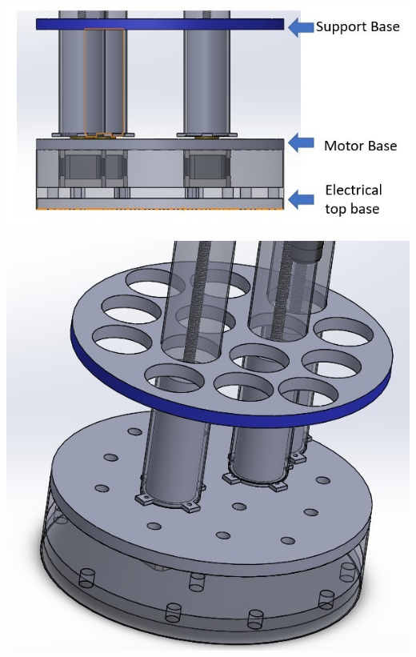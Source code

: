 \documentclass[11pt,landscape]{article}
\newenvironment{Figure}
  {\par\medskip\noindent\minipage{\linewidth}}
  {\endminipage\par\medskip}
\begin{document}
\begin{multicols}{3}
    \begin{Figure}
        \begin{center}
            \includegraphics[width=\textwidth]{Figure6.jpg}
            \label{fig:SIDE}
        \end{center}
    \end{Figure}
    
    \begin{Figure}
        \begin{center}
            \includegraphics[width=\textwidth]{Figure7.jpg}
            \label{fig:TOP}
        \end{center}
    \end{Figure}
    

\end{multicols}
\end{document}
